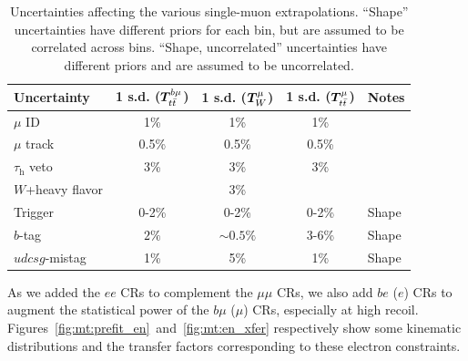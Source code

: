 \begin{table}[]
    \begin{center}
    \caption{Uncertainties affecting the various single-muon extrapolations. 
            ``Shape'' uncertainties have different priors for each bin, but are assumed to be correlated across bins. ``Shape, uncorrelated'' uncertainties have different priors and are assumed to be uncorrelated.}
    \label{tab:mt:zmm_uncs}
    \begin{tabular}{lcccl}
        Uncertainty                   & 1 s.d. ($\bm{T}^{b\mu}_{t\bar{t}}$) & 1 s.d. ($\bm{T}^{\mu}_{W}$) & 1 s.d. ($\bm{T}^{\mu}_{t\bar{t}}$)  & Notes \\ 
        \hline \hline 
        $\mu$ ID                      & 1\%                         & 1\%                   & 1\%                         & \\ 
        $\mu$ track                   & 0.5\%                       & 0.5\%                 & 0.5\%                       & \\ 
        $\tau_\mathrm{h}$ veto        & 3\%                         & 3\%                   &  3\%                        & \\ 
        $W$+heavy flavor              &                             & 3\%                   &                             & \\ 
        Trigger                       & 0-2\%                       & 0-2\%                 &  0-2\%                      & Shape \\ 
        $b$-tag                       & $2\%$                       & $\sim0.5\%$           &  3-6\%                      & Shape \\ 
        $udcsg$-mistag                & 1\%                         & 5\%                   & 1\%                         & Shape \\ 
    \end{tabular}
\end{center}
\end{table}

As we added the $ee$ CRs to complement the $\mu\mu$ CRs, we also add $be$ ($e$) CRs to augment the statistical power of the $b\mu$ ($\mu$) CRs, especially at high recoil.
Figures~\ref{fig:mt:prefit_en}~and~\ref{fig:mt:en_xfer} respectively show some kinematic distributions and the transfer factors corresponding to these electron constraints.

